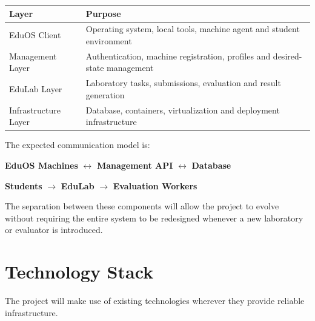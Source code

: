 \documentclass[12pt,a4paper]{article}
\begin{document}
\begin{center}
\begin{tabular}{|p{}|p{}|}
\hline
\textbf{Layer} & \textbf{Purpose} \\
\hline
EduOS Client & Operating system, local tools, machine agent and student environment \\
\hline
Management Layer & Authentication, machine registration, profiles and desired-state management \\
\hline
EduLab Layer & Laboratory tasks, submissions, evaluation and result generation \\
\hline
Infrastructure Layer & Database, containers, virtualization and deployment infrastructure \\
\hline
\end{tabular}
\end{center}

The expected communication model is:

\begin{center}

\textbf{EduOS Machines}
$\leftrightarrow$
\textbf{Management API}
$\leftrightarrow$
\textbf{Database}

\bigskip

\textbf{Students}
$\rightarrow$
\textbf{EduLab}
$\rightarrow$
\textbf{Evaluation Workers}

\end{center}

The separation between these components will allow the project to evolve without requiring the entire system to be redesigned whenever a new laboratory or evaluator is introduced.

\section{Technology Stack}

The project will make use of existing technologies wherever they provide reliable infrastructure.
\end{document}
